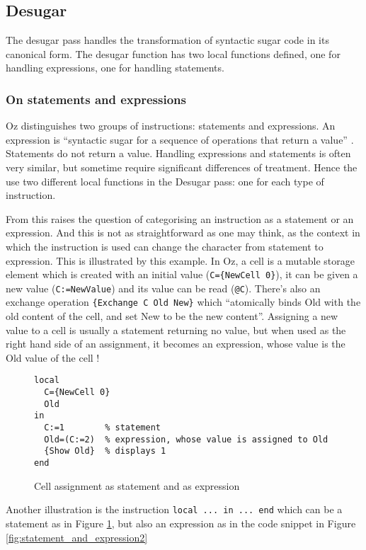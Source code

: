 \documentclass[a4paper]{memoir}
\begin{document}
\subsection{Desugar}\label{section:desugar}
The desugar pass handles the transformation of syntactic sugar code in its canonical form.
The desugar function has two local functions defined, one for handling expressions, one for handling statements.
\subsubsection{On statements and expressions}
Oz distinguishes two groups of instructions: statements and expressions. An expression is ``syntactic sugar for a sequence of operations that return a value'' . Statements do not return a value.
Handling expressions and statements is often very similar, but sometime require significant differences of treatment. Hence the use two different local functions in the Desugar pass: one for each type of instruction.

From this raises the question of categorising an instruction as a statement or an expression. And this is not as straightforward as one may think, as the context in which the instruction is used can change the character from statement to expression. This is illustrated by this example.
In Oz, a cell is a mutable storage element which is created with an initial value (\lstinline!C={NewCell 0}!), it can be given a new value (\lstinline!C:=NewValue!) and its value can be read (\lstinline!@C!). There's also an exchange operation \lstinline!{Exchange C Old New}! which ``atomically binds Old with the old content of the cell, and set New to be the new content''.%
Assigning a new value to a cell is usually a statement returning no value, but when used as the right hand side of an assignment, it becomes an expression, whose value is the Old value of the cell !
\begin{figure}[h]
\begin{lstlisting}
local
  C={NewCell 0}
  Old
in
  C:=1        % statement
  Old=(C:=2)  % expression, whose value is assigned to Old
  {Show Old}  % displays 1
end

\end{lstlisting}
\caption{Cell assignment as statement and as expression}
\label{fig:statement_and_expression1}
\end{figure}
Another illustration is the instruction \lstinline!local ... in ... end! which can be a statement as in Figure \ref{fig:statement_and_expression1}, but also an expression as in the code snippet in Figure \ref{fig:statement_and_expression2}
\end{document}
